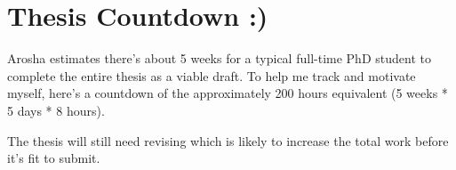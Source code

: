 \chapter{Thesis Countdown :)}
\label{app:thesis-countdown}
Arosha estimates there's about 5 weeks for a typical full-time PhD student to complete the entire thesis as a viable draft. To help me track and motivate myself, here's a countdown of the approximately 200 hours equivalent (5 weeks * 5 days * 8 hours).

The thesis will still need revising which is likely to increase the total work before it's fit to submit.
\newcommand\reverselabel[1]{%
  \def\theenumi{}%
  \renewcommand\makelabel{\makebox[\dimexpr\labelwidth-3pt\relax][r]{%
    \the\numexpr#1-\value{enumi}+1\relax}}}%

